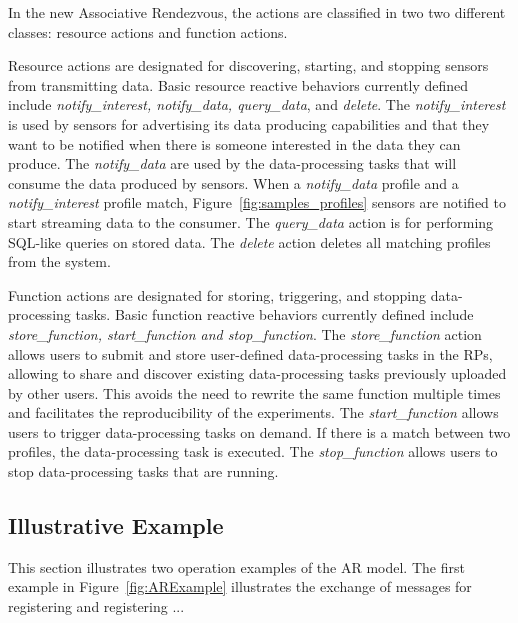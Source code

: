 In the new Associative Rendezvous, the actions are classified in two two different classes: resource actions and function actions. 

Resource actions are designated for discovering, starting, and stopping sensors from transmitting data. Basic resource reactive behaviors currently defined include {\it notify\_interest, notify\_data, query\_data}, and {\it delete}. The {\it notify\_interest} is used by sensors for advertising its data producing capabilities and that they want to be notified when there is someone interested in the data they can produce. The {\it notify\_data} are used by the data-processing tasks that will consume the data produced by sensors. When a {\it notify\_data} profile and a {\it notify\_interest} profile match, Figure~\ref{fig:samples_profiles} sensors are notified to start streaming data to the consumer. The {\it query\_data } action is for performing SQL-like queries on stored data. The {\it delete} action deletes all matching profiles from the system.

Function actions are designated for storing, triggering, and stopping data-processing tasks. Basic function reactive behaviors currently defined include {\it store\_function, start\_function and stop\_function}. The {\it store\_function} action allows users to submit and store user-defined data-processing tasks in the RPs, allowing to share and discover existing data-processing tasks previously uploaded by other users. This avoids the need to rewrite the same function multiple times and facilitates the reproducibility of the experiments. The {\it start\_function} allows users to trigger data-processing tasks on demand. %
If there is a match between two profiles, the data-processing task is executed. The {\it stop\_function} allows users to stop data-processing tasks that are running. %


\subsection{Illustrative Example}

This section illustrates two operation examples of the AR model. The first example in Figure~\ref{fig:ARExample} illustrates the exchange of messages for registering and registering ...

